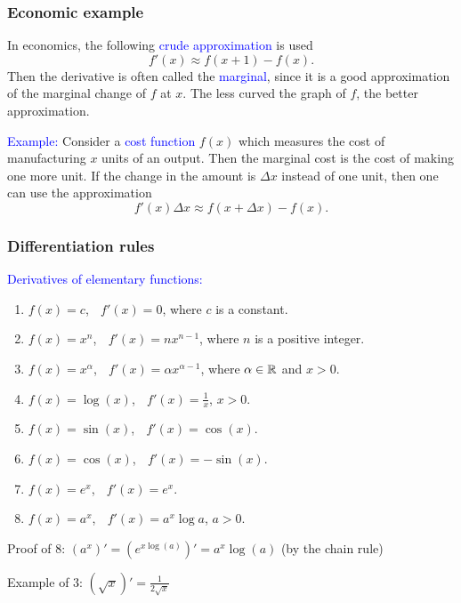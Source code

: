 \documentclass[11pt,aspectratio=169]{beamer}
\begin{document}
\begin{frame}
\frametitle{Economic example}
In economics, the following \textcolor{blue}{crude approximation} is used
$$
f'(x) \approx f(x+1)-f(x).
$$
Then the derivative is often called the \textcolor{blue}{marginal}, since it is a good approximation of the marginal change of $f$ at $x$. The less curved the graph of $f$, the better approximation.

\vskip 12pt

\textcolor{blue}{Example:} Consider a \textcolor{blue}{cost function} $f(x)$ which measures the cost of manufacturing $x$ units of an output. Then the marginal cost is the cost of making one more unit.
\vskip 12pt
 If the change in the amount is $\Delta x$ instead of one unit, then one can use the approximation
$$
f'(x)\Delta x \approx f(x+\Delta x)-f(x).
$$
%
%
\end{frame}

\begin{frame}
\frametitle{Differentiation rules}
\textcolor{blue}{Derivatives of elementary functions:}
\begin{enumerate}
\item $f(x)=c$, $\;$ $f'(x)=0$, where $c$ is a constant.
\item $f(x)=x^n$, $\;$ $f'(x)=nx^{n-1}$, where $n$ is a positive  integer.
\item $f(x)=x^{\alpha}$, $\;$ $f'(x)=\alpha x^{\alpha-1}$, where $\alpha \in \mathbb R$ and $x>0$.
\item $f(x)=\log(x)$, $\;$ $f'(x)=\frac{1}{x}$, $x>0$.
\item $f(x)=\sin(x)$, $\;$ $f'(x)=\cos(x)$.
\item $f(x)=\cos(x)$, $\;$ $f'(x)=-\sin(x)$.
\item $f(x)=e^x$, $\;$ $f'(x)=e^x$.
\item $f(x)=a^x$, $\;$ $f'(x)=a^x \log a$, $a>0$.
\end{enumerate}

\begin{tiny}Proof of 8: $(a^x)'=(e^{x\log(a)})'=a^x \log(a)$ (by the chain rule)\end{tiny}

\begin{tiny} Example of 3: $(\sqrt{x})'=\frac{1}{2\sqrt{x}}$ \end{tiny}



\end{frame}
\end{document}
